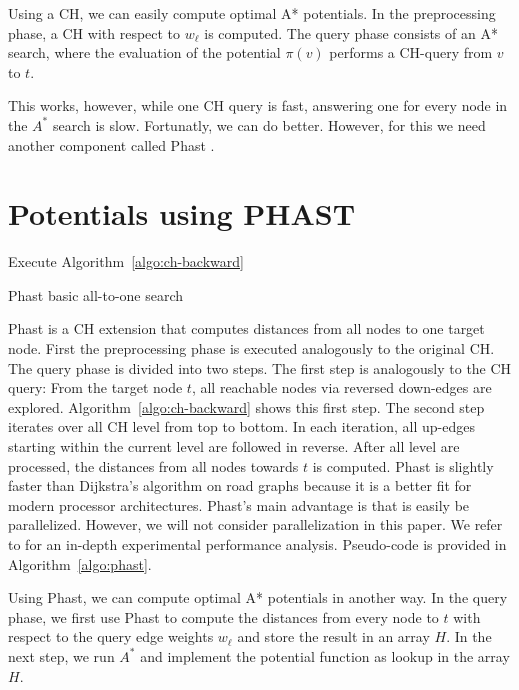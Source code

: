 \documentclass[a4paper,UKenglish,cleveref, autoref]{lipics-v2019}
\begin{document}
Using a CH, we can easily compute optimal A* potentials.
In the preprocessing phase, a CH with respect to $w_\ell$ is computed.
The query phase consists of an A* search, where the evaluation of the potential $\pi(v)$ performs a CH-query from $v$ to $t$.

This works, however, while one CH query is fast, answering one for every node in the $A^*$ search is slow.
Fortunatly, we can do better.
However, for this we need another component called Phast \cite{Phast}.

\section{Potentials using PHAST}

\begin{algorithm2e}
Execute Algorithm~\ref{algo:ch-backward}\;
\caption{Phast basic all-to-one search}
\label{algo:phast}
\end{algorithm2e}

Phast \cite{Phast} is a CH extension that computes distances from all nodes to one target node.
First the preprocessing phase is executed analogously to the original CH.
The query phase is divided into two steps.
The first step is analogously to the CH query:
From the target node $t$, all reachable nodes via reversed down-edges are explored.
Algorithm~\ref{algo:ch-backward} shows this first step.
The second step iterates over all CH level from top to bottom.
In each iteration, all up-edges starting within the current level are followed in reverse.
After all level are processed, the distances from all nodes towards $t$ is computed.
Phast is slightly faster than Dijkstra's algorithm on road graphs because it is a better fit for modern processor architectures.
Phast's main advantage is that is easily be parallelized.
However, we will not consider parallelization in this paper.
We refer to \cite{Phast} for an in-depth experimental performance analysis.
Pseudo-code is provided in Algorithm~\ref{algo:phast}.

Using Phast, we can compute optimal A* potentials in another way.
In the query phase, we first use Phast to compute the distances from every node to $t$ with respect to the query edge weights $w_\ell$ and store the result in an array $H$.
In the next step, we run $A^*$ and implement the potential function as lookup in the array $H$.
\end{document}
